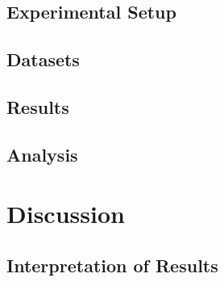 \documentclass[11pt,a4paper]{article}
\begin{document}

\subsection{Experimental Setup}
\label{subsec:setup}


\subsection{Datasets}
\label{subsec:datasets}

\subsection{Results}
\label{subsec:results}


\subsection{Analysis}
\label{subsec:analysis}


\section{Discussion}
\label{sec:discussion}


\subsection{Interpretation of Results}
\label{subsec:interpretation}

\end{document}
